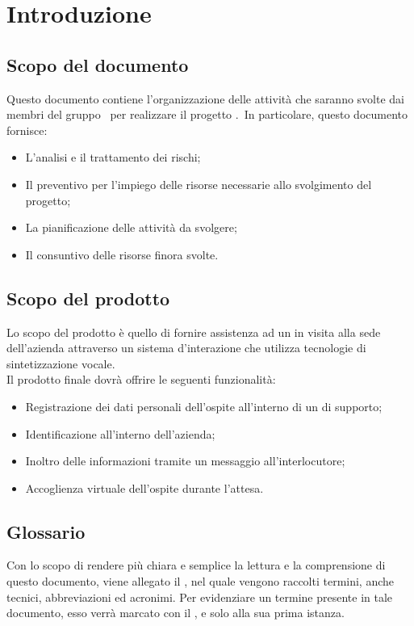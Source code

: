 \documentclass[../PianoDiProgetto_v4.0.0.tex]{subfiles}
\begin{document}
\section{Introduzione}

	\subsection{Scopo del documento}
	Questo documento contiene l'organizzazione delle attività che saranno svolte dai membri del gruppo \kpanic\ per realizzare il progetto \progetto.\ In particolare, questo documento fornisce:

	\begin{itemize}
		\item L'analisi e il trattamento dei rischi;
		\item Il preventivo per l'impiego delle risorse necessarie allo svolgimento del progetto;
		\item La pianificazione delle attività da svolgere;
		\item Il consuntivo delle risorse finora svolte.
	\end{itemize}
	
	\subsection{Scopo del prodotto}
	Lo scopo del prodotto è quello di fornire assistenza ad un  in visita alla sede dell'azienda attraverso un sistema d'interazione che utilizza tecnologie di sintetizzazione vocale.
	\\Il prodotto finale dovrà offrire le seguenti funzionalità:
	\begin{itemize}
		\item Registrazione dei dati personali dell'ospite all'interno di un  di supporto;
		\item Identificazione  all'interno dell'azienda;
		\item Inoltro delle informazioni tramite un messaggio  all'interlocutore;
		\item Accoglienza virtuale dell'ospite durante l'attesa.
	\end{itemize}

	\subsection{Glossario}
	Con lo scopo di rendere più chiara e semplice la lettura e la comprensione di questo documento, viene allegato il \glossariov, nel quale vengono raccolti termini, anche tecnici, abbreviazioni ed acronimi. Per evidenziare un termine presente in tale documento, esso verrà marcato con il , e solo alla sua prima istanza.
	
\end{document}
